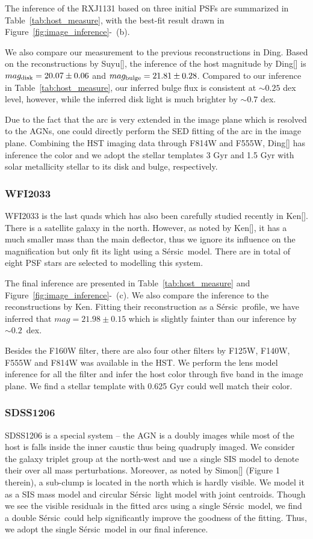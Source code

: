 \documentclass[fleqn,usenatbib]{mnras}
\newcommand{\sersic}{S\'ersic}
\begin{document}
The inference of the RXJ1131 based on three initial PSFs are summarized in Table~\ref{tab:host_measure}, with the best-fit result drawn in Figure~\ref{fig:image_inference}-~(b).

We also compare our measurement to the previous reconstructions in Ding. Based on the reconstructions by Suyu[], the inference of the host magnitude by Ding[] is $mag_{\rm disk} = 20.07\pm0.06$ and $mag_{\rm bulge} = 21.81 \pm 0.28$. Compared to our inference in Table~\ref{tab:host_measure}, our inferred bulge flux is consistent at $\sim0.25$ dex level, however, while the inferred disk light is much brighter by $\sim 0.7$ dex.

Due to the fact that the arc is very extended in the image plane which is resolved to the AGNs, one could directly perform the SED fitting of the arc in the image plane. Combining the HST imaging data through F814W and F555W, Ding[] has inference the color and we adopt the stellar templates 3 Gyr and 1.5 Gyr with solar metallicity stellar to its disk and bulge, respectively.

\subsubsection{WFI2033}
WFI2033 is the last quads which has also been carefully studied recently in Ken[]. There is a satellite galaxy in the north. However, as noted by Ken[], it has a much smaller mass than the main deflector, thus we ignore its influence on the magnification but only fit its light using a \sersic\ model. There are in total of eight PSF stars are selected to modelling this system.

The final inference are presented in Table~\ref{tab:host_measure} and Figure~\ref{fig:image_inference}-~(c). We also compare the inference to the reconstructions by Ken. Fitting their reconstruction as a \sersic\ profile, we have inferred that $mag = 21.98 \pm 0.15$ which is slightly fainter than our inference by $\sim0.2$~dex.

Besides the F160W filter, there are also four other filters by F125W, F140W, F555W and F814W was available in the HST. We perform the lens model inference for all the filter and infer the host color through five band in the image plane. We find a stellar template with 0.625 Gyr could well match their color.

\subsubsection{SDSS1206}
SDSS1206 is a special system -- the AGN is a doubly images while most of the host is falls inside the inner caustic thus being quadruply imaged. We consider the galaxy triplet group at the north-west and use a single SIS model to denote their over all mass perturbations. Moreover, as noted by Simon[] (Figure 1 therein), a sub-clump is located in the north which is hardly visible. We model it as a SIS mass model and circular \sersic\ light model with joint centroids. Though we see the visible residuals in the fitted arcs using a single \sersic\ model, we find a double \sersic\ could help significantly improve the goodness of the fitting. Thus, we adopt the single \sersic\ model in our final inference. 
\end{document}
